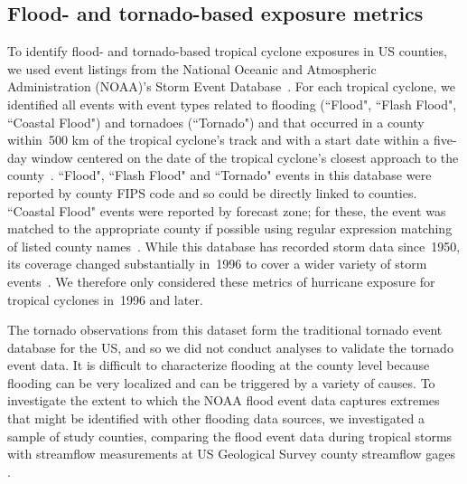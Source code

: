 \subsection*{Flood- and tornado-based exposure metrics}

To identify flood- and tornado-based tropical cyclone exposures in \ac{US}
counties, we used event listings from the National Oceanic and Atmospheric
Administration (NOAA)'s Storm Event Database~\parencite{stormevents}. For each
tropical cyclone, we identified all events with event types related to flooding
(``Flood", ``Flash Flood", ``Coastal Flood") and tornadoes (``Tornado") and
that occurred in a county within~500 \si{\kilo\metre} of the tropical cyclone's
track and with a start date within a five-day window centered on the date of
the tropical cyclone's closest approach to the
county~\parencite{hurricaneexposuredata}. ``Flood", ``Flash Flood" and
``Tornado" events in this database were reported by county \ac{FIPS} code and
so could be directly linked to counties.  ``Coastal Flood" events were reported
by forecast zone; for these, the event was matched to the appropriate county if
possible using regular expression matching of listed county
names~\parencite{noaastormevents}. While this database has recorded storm data
since~1950, its coverage changed substantially in~1996 to cover a wider variety
of storm events~\parencite{stormevents}. We therefore only considered these
metrics of hurricane exposure for tropical cyclones in~1996 and later.

The tornado observations from this dataset form the traditional tornado event
database for the \ac{US}, and so we did not conduct analyses to validate the
tornado event data. It is difficult to characterize flooding at the county
level because flooding can be very localized and can be triggered by a variety
of causes. To investigate the extent to which the NOAA flood event data
captures extremes that might be identified with other flooding data sources, we
investigated a sample of study counties, comparing the flood event data during
tropical storms with streamflow measurements at \ac{US} Geological Survey
county streamflow gages \parencite{usgsgages, countyfloods, dataRetrieval}.  

